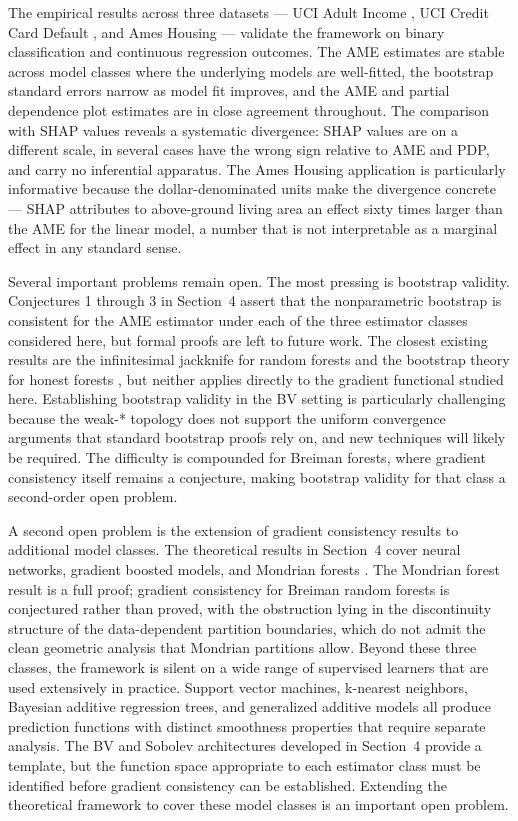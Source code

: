 \documentclass[12pt]{article}
\begin{document}
	The empirical results across three datasets --- UCI Adult Income \citep{kohavi1996, UCI}, UCI Credit Card Default \citep{yeh2009, UCI}, and Ames Housing \citep{decock2011} --- validate the framework on binary classification and continuous regression outcomes. The AME estimates are stable across model classes where the underlying models are well-fitted, the bootstrap standard errors narrow as model fit improves, and the AME and partial dependence plot estimates are in close agreement throughout. The comparison with SHAP values reveals a systematic divergence: SHAP values are on a different scale, in several cases have the wrong sign relative to AME and PDP, and carry no inferential apparatus. The Ames Housing application is particularly informative because the dollar-denominated units make the divergence concrete --- SHAP attributes to above-ground living area an effect sixty times larger than the AME for the linear model, a number that is not interpretable as a marginal effect in any standard sense.
	
	Several important problems remain open. The most pressing is bootstrap validity. Conjectures 1 through 3 in Section~4 assert that the nonparametric bootstrap is consistent for the AME estimator under each of the three estimator classes considered here, but formal proofs are left to future work. The closest existing results are the infinitesimal jackknife for random forests \citep{wager2014confidence} and the bootstrap theory for honest forests \citep{wager2018forests}, but neither applies directly to the gradient functional studied here. Establishing bootstrap validity in the BV setting is particularly challenging because the weak-* topology does not support the uniform convergence arguments that standard bootstrap proofs rely on, and new techniques will likely be required. The difficulty is compounded for Breiman forests, where gradient consistency itself remains a conjecture, making bootstrap validity for that class a second-order open problem.
	
	A second open problem is the extension of gradient consistency results to additional model classes. The theoretical results in Section~4 cover neural networks, gradient boosted models, and Mondrian forests \citep{lakshminarayanan2014mondrian, mourtada2017mondrian}. The Mondrian forest result is a full proof; gradient consistency for Breiman random forests \citep{breiman2001rf} is conjectured rather than proved, with the obstruction lying in the discontinuity structure of the data-dependent partition boundaries, which do not admit the clean geometric analysis that Mondrian partitions allow. Beyond these three classes, the framework is silent on a wide range of supervised learners that are used extensively in practice. Support vector machines, k-nearest neighbors, Bayesian additive regression trees, and generalized additive models all produce prediction functions with distinct smoothness properties that require separate analysis. The BV and Sobolev architectures developed in Section~4 provide a template, but the function space appropriate to each estimator class must be identified before gradient consistency can be established. Extending the theoretical framework to cover these model classes is an important open problem.
	
\end{document}
